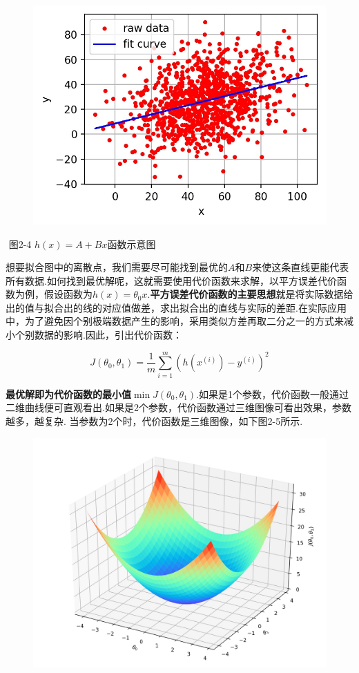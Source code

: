 \begin{figure}
\centering
\includegraphics{./img/ch2/2.16/1.jpg}
\caption{}
\end{figure}

​ 图2-4 $h(x) = A + Bx$函数示意图

​
想要拟合图中的离散点，我们需要尽可能找到最优的$A$和$B$来使这条直线更能代表所有数据.如何找到最优解呢，这就需要使用代价函数来求解，以平方误差代价函数为例，假设函数为$h(x)=\theta_0x$.
​
\textbf{平方误差代价函数的主要思想}就是将实际数据给出的值与拟合出的线的对应值做差，求出拟合出的直线与实际的差距.在实际应用中，为了避免因个别极端数据产生的影响，采用类似方差再取二分之一的方式来减小个别数据的影响.因此，引出代价函数：

\[
J(\theta_0, \theta_1) = \frac{1}{m}\sum_{i=1}^m(h(x^{(i)})-y^{(i)})^2
\]

​
\textbf{最优解即为代价函数的最小值}$\min J(\theta_0, \theta_1)$.如果是1个参数，代价函数一般通过二维曲线便可直观看出.如果是2个参数，代价函数通过三维图像可看出效果，参数越多，越复杂.
当参数为2个时，代价函数是三维图像，如下图2-5所示.

\begin{figure}
\centering
\includegraphics{./img/ch2/2.16/2.jpg}
\caption{}
\end{figure}

